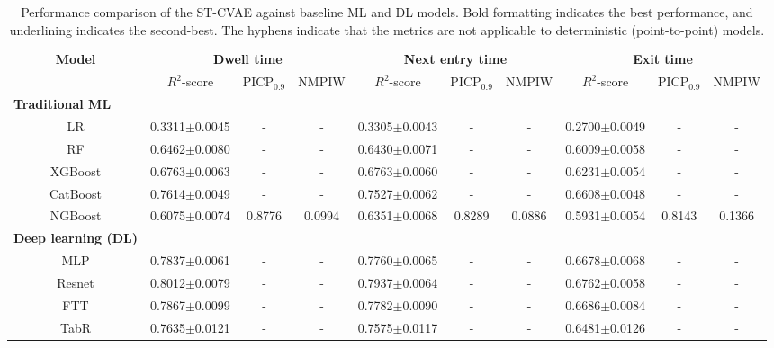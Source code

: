 \documentclass[journal]{IEEEtran}
\begin{document}
\begin{table}[ht]
    \centering
    \caption{Performance comparison of the ST-CVAE against baseline ML and DL models. Bold formatting indicates the best performance, and underlining indicates the second-best. The hyphens indicate that the metrics are not applicable to deterministic (point-to-point) models.}
    \label{tab:table2}
    \begin{tabular}{cccccccccc}
        \toprule
        \multirow{2}{4em}{\textbf{Model}} & \multicolumn{3}{c}{\textbf{Dwell time}} & \multicolumn{3}{c}{\textbf{Next entry time}} & \multicolumn{3}{c}{\textbf{Exit time}} \\
         \cmidrule(rl){2-10}
         & $R^{2}$-score & PICP$_{0.9}$ & NMPIW & $R^{2}$-score & PICP$_{0.9}$ & NMPIW & $R^{2}$-score & PICP$_{0.9}$ & NMPIW \\
        \midrule
        \multicolumn{1}{l}{\textbf{Traditional ML}}&&&&&&&&&\\
        LR       & 0.3311$\pm$0.0045 & -      & -      & 0.3305$\pm$0.0043 & -      & -      & 0.2700$\pm$0.0049 & -      & -      \\
        RF       & 0.6462$\pm$0.0080 & -      & -      & 0.6430$\pm$0.0071 & -      & -      & 0.6009$\pm$0.0058 & -      & -      \\
        XGBoost  & 0.6763$\pm$0.0063 & -      & -      & 0.6763$\pm$0.0060 & -      & -      & 0.6231$\pm$0.0054 & -      & -      \\
        CatBoost & 0.7614$\pm$0.0049 & -      & -      & 0.7527$\pm$0.0062 & -      & -      & 0.6608$\pm$0.0048 & -      & -      \\
        NGBoost  & 0.6075$\pm$0.0074 & 0.8776 & 0.0994 & 0.6351$\pm$0.0068 & 0.8289 & 0.0886 & 0.5931$\pm$0.0054 & 0.8143 & 0.1366 \\
        \multicolumn{1}{l}{\textbf{Deep learning (DL)}}&&&&&&&&&\\
        MLP            & 0.7837$\pm$0.0061 & -      & -      & 0.7760$\pm$0.0065 & -      & -      & 0.6678$\pm$0.0068 & -      & -      \\
        Resnet         & 0.8012$\pm$0.0079 & -      & -      & 0.7937$\pm$0.0064 & -      & -      & 0.6762$\pm$0.0058 & -      & -      \\
        FTT            & 0.7867$\pm$0.0099 & -      & -      & 0.7782$\pm$0.0090 & -      & -      & 0.6686$\pm$0.0084 & -      & -      \\
        TabR           & 0.7635$\pm$0.0121 & -      & -      & 0.7575$\pm$0.0117 & -      & -      & 0.6481$\pm$0.0126 & -      & -      \\

\end{tabular}
\end{table}
\end{document}
